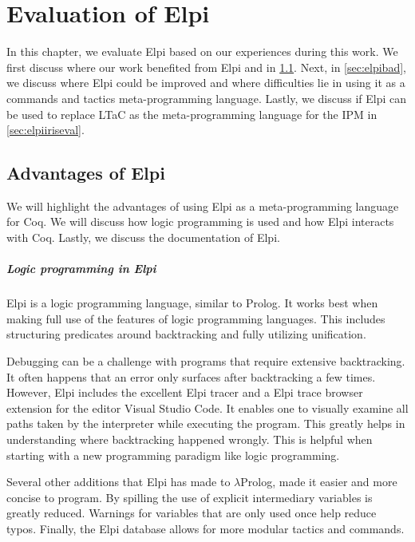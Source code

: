\documentclass[thesis.tex]{subfiles}
\begin{document}
\VerbatimFootnotes

\chapter{Evaluation of Elpi} \label{ch:evalelpi}
In this chapter, we evaluate Elpi based on our experiences during this work. We first discuss where our work benefited from Elpi and \ce in \cref{sec:elpigood}. Next, in \cref{sec:elpibad}, we discuss where Elpi could be improved and where difficulties lie in using it as a commands and tactics meta-programming language. Lastly, we discuss if Elpi can be used to replace LTaC as the meta-programming language for the IPM in \cref{sec:elpiiriseval}.

\section{Advantages of Elpi}\label{sec:elpigood}
We will highlight the advantages of using Elpi as a meta-programming language for Coq. We will discuss how logic programming is used and how Elpi interacts with Coq. Lastly, we discuss the documentation of Elpi.

\paragraph{Logic programming in Elpi}
Elpi is a logic programming language, similar to Prolog. It works best when making full use of the features of logic programming languages. This includes structuring predicates around backtracking and fully utilizing unification.

Debugging can be a challenge with programs that require extensive backtracking. It often happens that an error only surfaces after backtracking a few times. However, Elpi includes the excellent Elpi tracer and a Elpi trace browser extension \cite{tassiLPCICElpilang2023} for the editor Visual Studio Code. It enables one to visually examine all paths taken by the interpreter while executing the program. This greatly helps in understanding where backtracking happened wrongly. This is helpful when starting with a new programming paradigm like logic programming.

Several other additions that Elpi has made to $\lambda$Prolog, made it easier and more concise to program. By spilling the use of explicit intermediary variables is greatly reduced. Warnings for variables that are only used once help reduce typos. Finally, the Elpi database allows for more modular tactics and commands.
\end{document}
